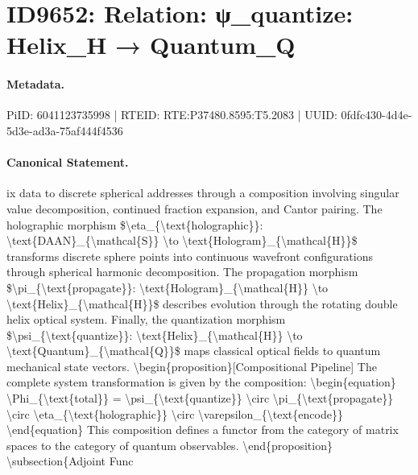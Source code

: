 \section*{ID9652: Relation: ψ\_quantize: Helix\_H → Quantum\_Q}
\paragraph{Metadata.}
PiID: 6041123735998 | RTEID: RTE:P37480.8595:T5.2083 | UUID: 0fdfc430-4d4e-5d3e-ad3a-75af444f4536

\paragraph{Canonical Statement.}
ix data to discrete spherical addresses through a composition involving singular value decomposition, continued fraction expansion, and Cantor pairing. The holographic morphism \$\textbackslash{}eta\_\{\textbackslash{}text\{holographic\}\}: \textbackslash{}text\{DAAN\}\_\{\textbackslash{}mathcal\{S\}\} \textbackslash{}to \textbackslash{}text\{Hologram\}\_\{\textbackslash{}mathcal\{H\}\}\$ transforms discrete sphere points into continuous wavefront configurations through spherical harmonic decomposition. The propagation morphism \$\textbackslash{}pi\_\{\textbackslash{}text\{propagate\}\}: \textbackslash{}text\{Hologram\}\_\{\textbackslash{}mathcal\{H\}\} \textbackslash{}to \textbackslash{}text\{Helix\}\_\{\textbackslash{}mathcal\{H\}\}\$ describes evolution through the rotating double helix optical system. Finally, the quantization morphism \$\textbackslash{}psi\_\{\textbackslash{}text\{quantize\}\}: \textbackslash{}text\{Helix\}\_\{\textbackslash{}mathcal\{H\}\} \textbackslash{}to \textbackslash{}text\{Quantum\}\_\{\textbackslash{}mathcal\{Q\}\}\$ maps classical optical fields to quantum mechanical state vectors. \textbackslash{}begin\{proposition\}[Compositional Pipeline] The complete system transformation is given by the composition: \textbackslash{}begin\{equation\} \textbackslash{}Phi\_\{\textbackslash{}text\{total\}\} = \textbackslash{}psi\_\{\textbackslash{}text\{quantize\}\} \textbackslash{}circ \textbackslash{}pi\_\{\textbackslash{}text\{propagate\}\} \textbackslash{}circ \textbackslash{}eta\_\{\textbackslash{}text\{holographic\}\} \textbackslash{}circ \textbackslash{}varepsilon\_\{\textbackslash{}text\{encode\}\} \textbackslash{}end\{equation\} This composition defines a functor from the category of matrix spaces to the category of quantum observables. \textbackslash{}end\{proposition\} \textbackslash{}subsection\{Adjoint Func

